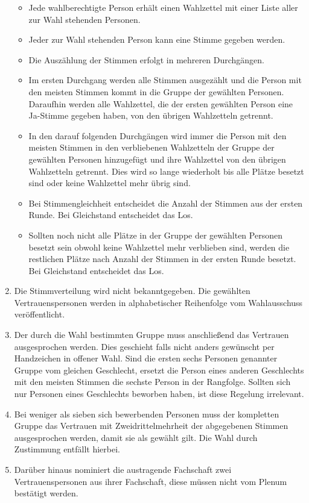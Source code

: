 \documentclass[
  a4paper,
  oneside]{scrartcl}
\providecommand{\tightlist}{%
  \setlength{\itemsep}{0pt}\setlength{\parskip}{0pt}}
\begin{document}
\begin{enumerate}
  \begin{itemize}
  \tightlist
  \item
    Jede wahlberechtigte Person erhält einen Wahlzettel mit einer Liste
    aller zur Wahl stehenden Personen.
  \item
    Jeder zur Wahl stehenden Person kann eine Stimme gegeben werden.
  \item
    Die Auszählung der Stimmen erfolgt in mehreren Durchgängen.
  \item
    Im ersten Durchgang werden alle Stimmen ausgezählt und die Person
    mit den meisten Stimmen kommt in die Gruppe der gewählten Personen.
    Daraufhin werden alle Wahlzettel, die der ersten gewählten Person
    eine Ja-Stimme gegeben haben, von den übrigen Wahlzetteln getrennt.
  \item
    In den darauf folgenden Durchgängen wird immer die Person mit den
    meisten Stimmen in den verbliebenen Wahlzetteln der Gruppe der
    gewählten Personen hinzugefügt und ihre Wahlzettel von den übrigen
    Wahlzetteln getrennt. Dies wird so lange wiederholt bis alle Plätze
    besetzt sind oder keine Wahlzettel mehr übrig sind.
  \item
    Bei Stimmengleichheit entscheidet die Anzahl der Stimmen aus der
    ersten Runde. Bei Gleichstand entscheidet das Los.
  \item
    Sollten noch nicht alle Plätze in der Gruppe der gewählten Personen
    besetzt sein obwohl keine Wahlzettel mehr verblieben sind, werden
    die restlichen Plätze nach Anzahl der Stimmen in der ersten Runde
    besetzt. Bei Gleichstand entscheidet das Los.
  \end{itemize}
\item
  Die Stimmverteilung wird nicht bekanntgegeben. Die gewählten
  Vertrauenspersonen werden in alphabetischer Reihenfolge vom
  Wahlausschuss veröffentlicht.
\item
  Der durch die Wahl bestimmten Gruppe muss anschließend das Vertrauen
  ausgesprochen werden. Dies geschieht falls nicht anders gewünscht per
  Handzeichen in offener Wahl. Sind die ersten sechs Personen genannter
  Gruppe vom gleichen Geschlecht, ersetzt die Person eines anderen
  Geschlechts mit den meisten Stimmen die sechste Person in der
  Rangfolge. Sollten sich nur Personen eines Geschlechts beworben haben,
  ist diese Regelung irrelevant.
\item
  Bei weniger als sieben sich bewerbenden Personen muss der kompletten
  Gruppe das Vertrauen mit Zweidrittelmehrheit der abgegebenen Stimmen
  ausgesprochen werden, damit sie als gewählt gilt. Die Wahl durch
  Zustimmung entfällt hierbei.
\item
  Darüber hinaus nominiert die austragende Fachschaft zwei
  Vertrauenspersonen aus ihrer Fachschaft, diese müssen nicht vom Plenum
  bestätigt werden.
\end{enumerate}
\end{document}
